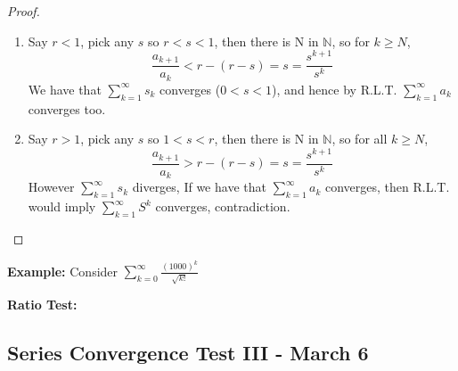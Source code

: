 \documentclass[12pt]{article}
\theoremstyle{plain}
\newcommand{\mN}{{\mathbb{N}}}
\begin{document}
\begin{proof}
	$ $
	\begin{enumerate}
	\item
	Say $r < 1$, pick any $s$ so $r < s < 1$, then there is N in $\mN$, so
	for $k \geq N$, 
	\[
		\frac{a_{k+1}}{a_k} < r-(r-s) = s = \frac{s^{k+1}}{s^k} 
	\]
	We have that $\sum_{k=1}^{\infty} s_k$ converges ($0 < s < 1$), and hence
	by R.L.T. $\sum_{k=1}^{\infty} a_k$ converges too. 

	\item
	Say $r > 1$, pick any $s$ so $1 < s < r$, then there is N in $\mN$, so
	for all $k \geq N$, 
	\[
		\frac{a_{k+1}}{a_k} > r-(r-s) = s = \frac{s^{k+1}}{s^k} 
	\]
	However $\sum_{k=1}^{\infty} s_k$ diverges, If we have that 
	$\sum_{k=1}^{\infty} a_k$ converges, then R.L.T. would imply 
	$\sum_{k=1}^{\infty} S^k$ converges, contradiction.  
	\end{enumerate}
\end{proof}

{\color{Brown}
	\textbf{Example: }
	Consider $\sum_{k=0}^{\infty} \frac{(1000)^k}{\sqrt{k!}}$

	\textbf{Ratio Test: }


}

\subsection{Series Convergence Test III - March 6}
\end{document}
